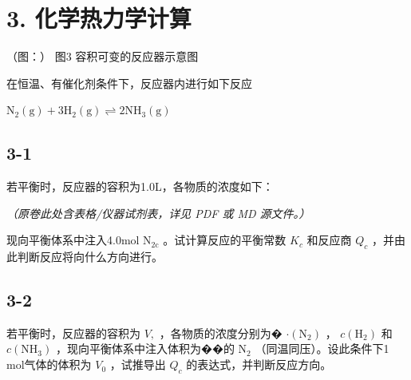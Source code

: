 \section*{3. 化学热力学计算}
（图：）
图3 容积可变的反应器⽰意图

在恒温、有催化剂条件下，反应器内进⾏如下反应

$
\mathrm{N} _ {2} (\mathrm{g}) + 3 \mathrm{H} _ {2} (\mathrm{g}) \rightleftharpoons 2 \mathrm{NH} _ {3} (\mathrm{g})
$

\subsection*{3-1}
若平衡时，反应器的容积为1.0L，各物质的浓度如下：

\textit{（原卷此处含表格/仪器试剂表，详见 PDF 或 MD 源文件。）}

现向平衡体系中注⼊4.0mol $\mathrm { N } _ { 2 \mathrm { c } }$ 。试计算反应的平衡常数 $K _ { c }$ 和反应商 $Q _ { c }$ ，并由此判断反应将向什么⽅向进⾏。

\subsection*{3-2}
若平衡时，反应器的容积为 $V ,$ ，各物质的浓度分别为� $\cdot ( \mathrm { N } _ { 2 } )$ ， $c \left( \mathrm { { H } _ { 2 } } \right)$ 和 $c ( \mathrm { N H } _ { 3 } )$ ，现向平衡体系中注⼊体积为��的 $\mathrm { N } _ { 2 }$ （同温同压）。设此条件下1 mol⽓体的体积为 $V _ { 0 }$ ，试推导出 $Q _ { c }$ 的表达式，并判断反应⽅向。

